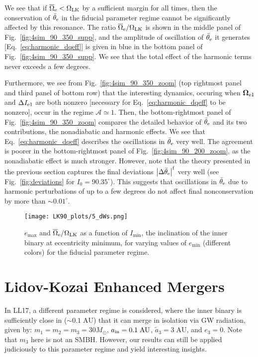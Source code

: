 \documentclass[
        twocolumn,
        twocolappendix
    ]{aastex63}
\newcommand*{\abs}[1]{\left|#1\right|}
\renewcommand*{\bm}[1]{\boldsymbol{\mathbf{#1}}}
\begin{document}
We see that if $\overline{\Omega}_{\rm e} < \Omega_{\rm LK}$ by a sufficient
margin for all times, then the conservation of $\bar{\theta}_{\rm e}$ in the
fiducial parameter regime cannot be significantly affected by this resonance.
The ratio $\overline{\Omega}_{\rm e} / \Omega_{\rm LK}$ is shown in the middle
panel of Fig.~\ref{fig:4sim_90_350_supp}, and the amplitude of oscillation of
$\bar{\theta}_{\rm e}$ it generates [Eq.~\eqref{eq:harmonic_dqeff}] is given in
blue in the bottom panel of Fig.~\ref{fig:4sim_90_350_supp}. We see that the
total effect of the harmonic terms never exceeds a few degrees.

Furthermore, we see from Fig.~\ref{fig:4sim_90_350_zoom} (top rightmost panel and
third panel of bottom row) that the interesting dynamics, occuring when
$\bm{\Omega}_{\rm e1}$ and $\Delta I_{\rm e1}$ are both nonzero [necessary for
Eq.~\eqref{eq:harmonic_dqeff} to be nonzero], occur in the regime $\mathcal{A}
\simeq 1$. Then, the bottom-rightmost panel of Fig.~\ref{fig:4sim_90_350_zoom}
compares the detailed behavior of $\bar{\theta}_{\rm e}$ and its two
contributions, the nonadiabatic and harmonic effects. We see that
Eq.~\eqref{eq:harmonic_dqeff} describes the oscillations in $\bar{\theta}_{\rm
e}$ very well. The agreement is poorer in the bottom-rightmost panel of
Fig.~\ref{fig:4sim_90_200_zoom}, as the nonadiabatic effect is much stronger.
However, note that the theory presented in the previous section captures the
final deviations $\abs{\Delta \bar{\theta}_{\rm e}}^{\rm f}$ very well (see
Fig.~\ref{fig:deviations} for $I_0 = 90.35^\circ$). This suggests that
oscillations in $\bar{\theta}_{\rm e}$ due to harmonic perturbations of up to a
few degrees do not affect final nonconservation by more than $\sim 0.01^\circ$.

\begin{figure}
    \centering
    \texttt{[image: LK90\_plots/5\_dWs.png]}
    \caption{$e_{\max}$ and $\overline{\Omega}_{\rm e} / \Omega_{\rm LK}$ as a
    function of $I_{\min}$, the inclination of the inner binary at eccentricity
    minimum, for varying values of $e_{\min}$ (different colors) for the
    fiducial parameter regime. }\label{fig:dWs}
\end{figure}

\section{Lidov-Kozai Enhanced Mergers}\label{s:lk_enhanced}

In LL17, a different parameter regime is considered,
where the inner binary is sufficiently close in ($\sim 0.1\;\mathrm{AU}$) that
it can merge in isolation via GW radiation, given by: $m_1 = m_2 = m_3 =
30M_{\odot}$, $a_{\rm in} = 0.1\;\mathrm{AU}$, $\tilde{a}_3 = 3\;\mathrm{AU}$,
and $e_3 = 0$. Note that $m_3$ here is not an SMBH\@. However, our results can
still be applied judiciously to this parameter regime and yield interesting
insights.
\end{document}
